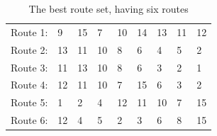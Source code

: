     \begin{table}[H]
    \centering
    \begin{tabular}{|l|l l l l l l l l|}
    \hline
    Route 1: & 9 & 15 & 7 & 10 & 14 & 13 & 11 & 12 \\
    Route 2: & 13 & 11 & 10 & 8 & 6 & 4 & 5 & 2 \\
    Route 3: & 11 & 13 & 10 & 8 & 6 & 3 & 2 & 1 \\
    Route 4: & 12 & 11 & 10 & 7 & 15 & 6 & 3 & 2 \\
    Route 5: & 1 & 2 & 4 & 12 & 11 & 10 & 7 & 15 \\
    Route 6: & 12 & 4 & 5 & 2 & 3 & 6 & 8 & 15 \\
    \hline
    \end{tabular}
    \caption {The best route set, having six routes}
    \label{table:performanceComparison_bestRouteSet6}
    \end{table}

